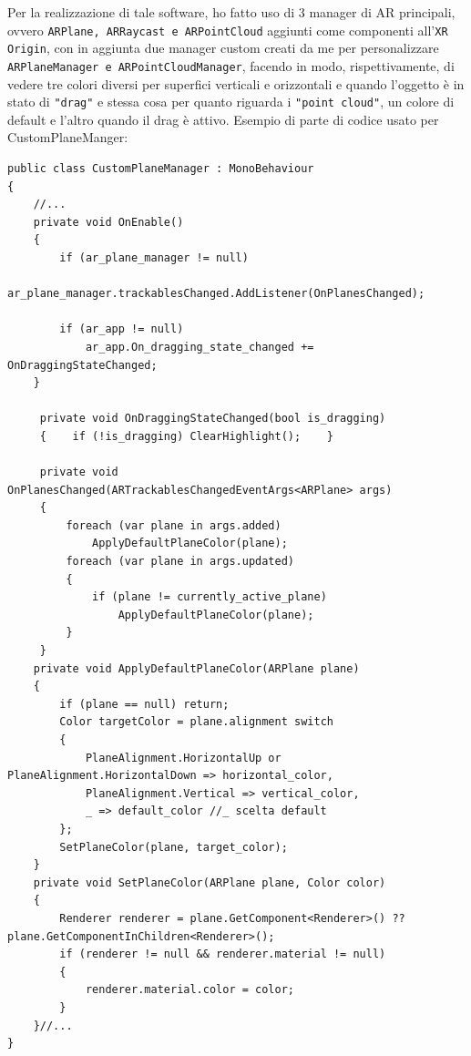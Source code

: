 Per la realizzazione di tale software, ho fatto uso di 3 manager di AR principali, ovvero \texttt{ARPlane, ARRaycast e ARPointCloud} aggiunti come componenti all'\texttt{XR Origin}, con in aggiunta due manager custom creati da me per personalizzare \texttt{ARPlaneManager e ARPointCloudManager}, facendo in modo, rispettivamente, di vedere tre colori diversi per superfici verticali e orizzontali e quando l'oggetto è in stato di \texttt{"drag"} e stessa cosa per quanto riguarda i \texttt{"point cloud"}, un colore di default e l'altro quando il drag è attivo. Esempio di parte di codice usato per CustomPlaneManger: 
\begin{lstlisting}[language={[Sharp]C}]
public class CustomPlaneManager : MonoBehaviour
{
    //...
    private void OnEnable()
    {
        if (ar_plane_manager != null)
            ar_plane_manager.trackablesChanged.AddListener(OnPlanesChanged);
        
        if (ar_app != null)                                          
            ar_app.On_dragging_state_changed += OnDraggingStateChanged;
    }
    
     private void OnDraggingStateChanged(bool is_dragging)
     {    if (!is_dragging) ClearHighlight();    }
     
     private void OnPlanesChanged(ARTrackablesChangedEventArgs<ARPlane> args)
     {
         foreach (var plane in args.added)
             ApplyDefaultPlaneColor(plane);
         foreach (var plane in args.updated)
         {
             if (plane != currently_active_plane)
                 ApplyDefaultPlaneColor(plane);
         }
     }
    private void ApplyDefaultPlaneColor(ARPlane plane)
    {
        if (plane == null) return;
        Color targetColor = plane.alignment switch
        {
            PlaneAlignment.HorizontalUp or PlaneAlignment.HorizontalDown => horizontal_color,
            PlaneAlignment.Vertical => vertical_color,
            _ => default_color //_ scelta default
        };
        SetPlaneColor(plane, target_color);
    }
    private void SetPlaneColor(ARPlane plane, Color color)
    {
        Renderer renderer = plane.GetComponent<Renderer>() ?? plane.GetComponentInChildren<Renderer>();
        if (renderer != null && renderer.material != null)
        {
            renderer.material.color = color;
        }
    }//...
}
\end{lstlisting}


